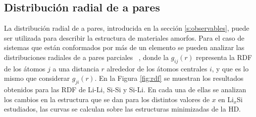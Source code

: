 \subsection{Distribución radial de a pares}

La distribución radial de a pares, introducida en la sección \ref{s:observables},
puede ser utilizada para describir la estructura de materiales amorfos. Para el 
caso de sistemas que están conformados por más de un elemento se pueden analizar 
las distribuciones radiales de a pares parciales ~\cite{lamparter1995}, donde la 
$g_{ij}(r)$ representa la RDF de los átomos $j$ a una distancia $r$ alrededor de 
los átomos centrales $i$, y que es lo mismo que considerar $g_{ji}(r)$. En la 
Figura \ref{fig:rdf} se muestran los resultados obtenidos para las RDF de Li-Li, 
Si-Si y Si-Li. En cada una de ellas se analizan los cambios en la estructura que 
se dan para los distintos valores de $x$ en Li$_x$Si estudiados, las curvas se 
calculan sobre las estructuras minimizadas de la HD.

